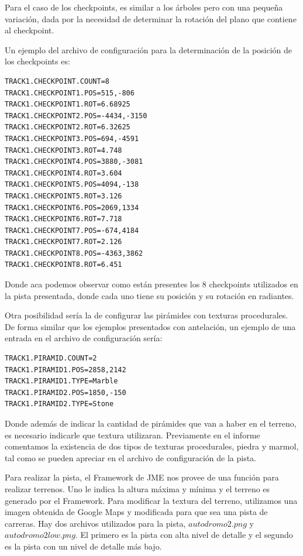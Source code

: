 \documentclass[a4paper,10pt]{article}
\begin{document}
Para el caso de los checkpoints, es similar a los \'arboles pero con una
peque\~na
variaci\'on, dada por la necesidad de determinar la rotaci\'on del plano que
contiene al checkpoint.

Un ejemplo del archivo de configuraci\'on para la determinaci\'on de la
posici\'on
de
los checkpoints es:

\begin{verbatim}
TRACK1.CHECKPOINT.COUNT=8
TRACK1.CHECKPOINT1.POS=515,-806
TRACK1.CHECKPOINT1.ROT=6.68925
TRACK1.CHECKPOINT2.POS=-4434,-3150
TRACK1.CHECKPOINT2.ROT=6.32625
TRACK1.CHECKPOINT3.POS=694,-4591
TRACK1.CHECKPOINT3.ROT=4.748
TRACK1.CHECKPOINT4.POS=3880,-3081
TRACK1.CHECKPOINT4.ROT=3.604
TRACK1.CHECKPOINT5.POS=4094,-138
TRACK1.CHECKPOINT5.ROT=3.126
TRACK1.CHECKPOINT6.POS=2069,1334
TRACK1.CHECKPOINT6.ROT=7.718
TRACK1.CHECKPOINT7.POS=-674,4184
TRACK1.CHECKPOINT7.ROT=2.126
TRACK1.CHECKPOINT8.POS=-4363,3862
TRACK1.CHECKPOINT8.ROT=6.451
\end{verbatim}

Donde aca podemos observar como est\'an presentes los 8 checkpoints utilizados
en
la pista presentada, donde cada uno tiene su posici\'on y su rotaci\'on en
radiantes.

Otra posibilidad ser\'ia la de configurar las pir\'amides con texturas
procedurales.  De forma similar que los ejemplos presentados con antelaci\'on,
un
ejemplo de una entrada en el archivo de configuraci\'on ser\'ia:

\begin{verbatim}
TRACK1.PIRAMID.COUNT=2
TRACK1.PIRAMID1.POS=2858,2142
TRACK1.PIRAMID1.TYPE=Marble
TRACK1.PIRAMID2.POS=1850,-150
TRACK1.PIRAMID2.TYPE=Stone
\end{verbatim}

Donde adem\'as de indicar la cantidad de pir\'amides que van a haber en el
terreno,
es necesario indicarle que textura utilizaran.  Previamente en el informe
comentamos la existencia de dos tipos de texturas procedurales, piedra y
marmol, tal como se pueden apreciar en el archivo de configuraci\'on de la
pista.

Para realizar la pista, el Framework de JME nos provee de una funci\'on para
realizar terrenos.  Uno le indica la altura m\'axima y m\'inima y el terreno es
generado por el Framework.  Para modificar la textura del terreno, utilizamos
una imagen obtenida de Google Maps y modificada para que sea una pista de
carreras.  Hay dos archivos utilizados para la pista, $autodromo2.png$ y
$autodromo2low.png$.  El primero es la pista con alta nivel de detalle y el
segundo es la pista con un nivel de detalle m\'as bajo.
\end{document}
